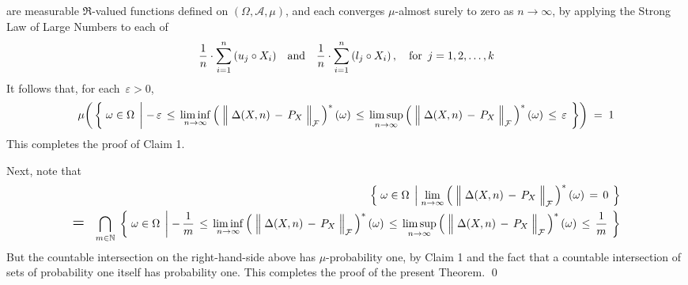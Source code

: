 are measurable $\Re$-valued functions defined on $(\Omega,\mathcal{A},\mu)$, and
each converges $\mu$-almost surely to zero as $n \longrightarrow \infty$,
by applying the Strong Law of Large Numbers to each of
\begin{equation*}
\dfrac{1}{n}\cdot \overset{n}{\underset{i=1}{\sum}}\,(u_{j} \circ X_{i})
\quad\textnormal{and}\quad
\dfrac{1}{n}\cdot \overset{n}{\underset{i=1}{\sum}}\,(l_{j} \circ X_{i})\,,
\quad\textnormal{for \,$j = 1, 2, \ldots, k$}
\end{equation*}
It follows that, for each \,$\varepsilon > 0$,
\begin{equation*}
\mu\!\left(\,\left\{\;
	\omega\in\Omega
\;\left\vert\;
	-\,\varepsilon
	\,\leq\,
	\underset{n\rightarrow\infty}{\liminf}
	\left(\;\left\Vert\;\Delta(X,n) \,\overset{{\color{white}.}}{-}\, P_{X}\;\right\Vert_{\mathcal{F}}\,\right)^{*}(\omega)
	\,\leq\,
	\underset{n\rightarrow\infty}{\limsup}
	\left(\;\left\Vert\;\Delta(X,n) \,\overset{{\color{white}.}}{-}\, P_{X}\;\right\Vert_{\mathcal{F}}\,\right)^{*}(\omega)
	\,\leq\,
	\varepsilon
\right.
\;\right\}\right)
\;=\; 1
\end{equation*}
This completes the proof of Claim 1.

\vskip 0.3cm
\noindent
Next, note that
\begin{eqnarray*}
&&
	\left\{\;
		\omega\in\Omega
	\;\left\vert\;
		\underset{n\rightarrow\infty}{\lim}
		\left(\;\left\Vert\;\Delta(X,n) \,\overset{{\color{white}.}}{-}\, P_{X}\;\right\Vert_{\mathcal{F}}\,\right)^{*}(\omega)
		\,=\,
		0
	\right.
	\;\right\}
\\
& \mathlarger{\mathlarger{=}} &
	\underset{m\in\N}{\bigcap}\;
	\left\{\;
		\omega\in\Omega
	\;\left\vert\;
		-\,\dfrac{1}{m}
		\,\leq\,
		\underset{n\rightarrow\infty}{\liminf}
		\left(\;\left\Vert\;\Delta(X,n) \,\overset{{\color{white}.}}{-}\, P_{X}\;\right\Vert_{\mathcal{F}}\,\right)^{*}(\omega)
		\,\leq\,
		\underset{n\rightarrow\infty}{\limsup}
		\left(\;\left\Vert\;\Delta(X,n) \,\overset{{\color{white}.}}{-}\, P_{X}\;\right\Vert_{\mathcal{F}}\,\right)^{*}(\omega)
		\,\leq\,
		\dfrac{1}{m}
	\right.
	\;\right\}
\end{eqnarray*}
But the countable intersection on the right-hand-side above has $\mu$-probability one,
by Claim 1 and the fact that a countable intersection of sets of probability one itself has probability one.
This completes the proof of the present Theorem.
\qed



\renewcommand{\theenumi}{\roman{enumi}}
\renewcommand{\labelenumi}{\textnormal{(\theenumi)}$\;\;$}

